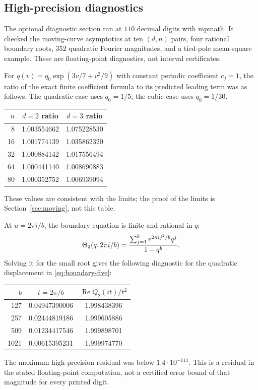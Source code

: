 \documentclass[11pt,a4paper]{article}
\numberwithin{equation}{section}
\theoremstyle{definition}\newtheorem{definition}[theorem]{Definition}
\theoremstyle{remark}\newtheorem{remark}[theorem]{Remark}
\theoremstyle{definition}
\newcommand{\Rea}{\operatorname{Re}}\newcommand{\Ima}{\operatorname{Im}}
\begin{document}
\subsection{High-precision diagnostics}
The optional diagnostic section ran at $110$ decimal digits with mpmath.
It checked the moving-curve asymptotics at ten $(d,n)$ pairs, four rational
boundary roots, $352$ quadratic Fourier magnitudes, and a tied-pole
mean-square example. These are floating-point diagnostics, not interval
certificates.

For $q(v)=q_0\exp(3v/7+v^2/9)$ with constant periodic coefficient $c_j=1$,
the ratio of the exact finite coefficient formula to its predicted leading
term was as follows. The quadratic case uses $q_0=1/5$; the cubic case uses
$q_0=1/30$.
\begin{center}
\begin{tabular}{rcc}
\toprule
$n$ & $d=2$ ratio & $d=3$ ratio\\
\midrule
8  & 1.003554662 & 1.075228530\\
16 & 1.001774139 & 1.035862320\\
32 & 1.000884142 & 1.017556494\\
64 & 1.000441140 & 1.008690883\\
80 & 1.000352752 & 1.006939094\\
\bottomrule
\end{tabular}
\end{center}
These values are consistent with the limits; the proof of the limits is
Section~\ref{sec:moving}, not this table.

At $u=2\pi i/b$, the boundary equation is finite and rational in $q$:
\begin{equation}
 \Theta_2(q,2\pi i/b)
 =\frac{\sum_{j=1}^{b}\mathrm e^{2\pi i j^2/b}q^j}{1-q^b}.
 \label{eq:boundary-rational}
\end{equation}
Solving it for the small root gives the following diagnostic for the
quadratic displacement in \eqref{eq:boundary-five}:
\begin{center}
\begin{tabular}{rcc}
\toprule
$b$ & $t=2\pi/b$ & $\Rea Q_2(it)/t^2$\\
\midrule
127  & 0.04947390006 & 1.998438396\\
257  & 0.02444819186 & 1.999605886\\
509  & 0.01234417546 & 1.999898701\\
1021 & 0.00615395231 & 1.999974770\\
\bottomrule
\end{tabular}
\end{center}
The maximum high-precision residual was below $1.4\cdot10^{-114}$.
This is a residual in the stated floating-point computation, not a certified
error bound of that magnitude for every printed digit.
\end{document}
